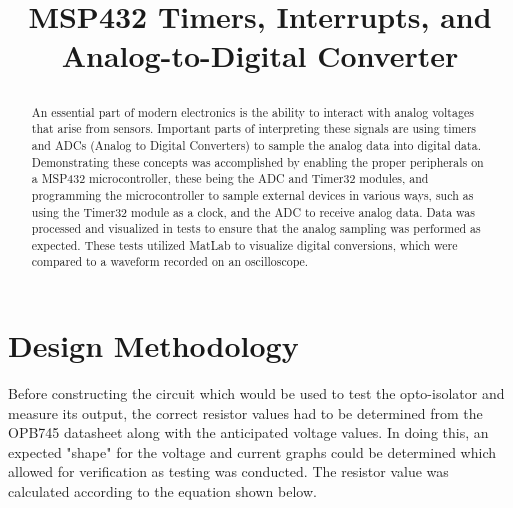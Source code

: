 \documentclass[conference]{IEEEtran}
\begin{document}
\title{MSP432 Timers, Interrupts, and Analog-to-Digital Converter\\

\author{
\and
{}
}
}

\maketitle

\begin{abstract}
An essential part of modern electronics is the ability to interact with
analog voltages that arise from sensors. Important parts of interpreting
these signals are using timers and ADCs (Analog to Digital Converters) to
sample the analog data into digital data. Demonstrating these concepts was
accomplished by enabling the proper peripherals on a MSP432 microcontroller,
these being the ADC and Timer32 modules, and programming the microcontroller
to sample external devices in various ways, such as using the Timer32 module
as a clock, and the ADC to receive analog data. Data was processed and
visualized in tests to ensure that the analog sampling was performed as
expected. These tests utilized MatLab to visualize digital conversions,
which were compared to a waveform recorded on an oscilloscope.
\end{abstract}

\section{Design Methodology}

Before constructing the circuit which would be used to test the opto-isolator and measure its output, the correct resistor values
had to be determined from the OPB745 datasheet along with the anticipated voltage values. In doing this, an expected "shape" for the
voltage and current graphs could be determined which allowed for verification as testing was conducted. The resistor value was
calculated according to the equation shown below.
\end{document}

